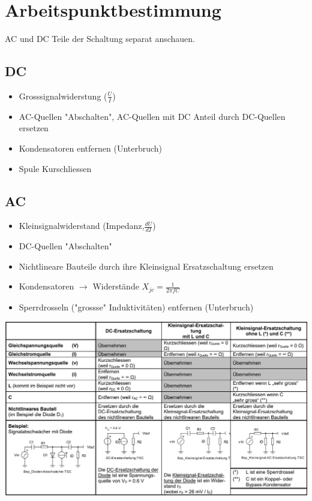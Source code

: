 \documentclass[margin=normal]{tex/hsrzf}
\begin{document}
\section{Arbeitspunktbestimmung}
AC und DC Teile der Schaltung separat anschauen.
\begin{multicols}{2}

  \subsection{DC}
  \begin{itemize}
    \item Grosssignalwiderstung ($\frac{U}{I}$)
    \item AC-Quellen "Abschalten", AC-Quellen mit DC Anteil durch DC-Quellen ersetzen
    \item Kondensatoren entfernen (Unterbruch)
    \item Spule Kurschliessen
  \end{itemize}
  \subsection{AC}
  \begin{itemize}
    \item Kleinsignalwiderstand (Impedanz,$\frac{dU}{dI}$)
    \item DC-Quellen "Abschalten"
    \item Nichtlineare Bauteile durch ihre Kleinsignal Ersatzschaltung ersetzen
    \item Kondensatoren $\to$ Widerstände $X_{jc}= \frac{1}{2\pi f C}$
    \item Sperrdrosseln ("grossse" Induktivitäten) entfernen (Unterbruch)
  \end{itemize}
\end{multicols}

\includegraphics[width = 15cm]{img/Tabelle Kleinsignal Ersatzschaltung.png}
\newpage
\end{document}
